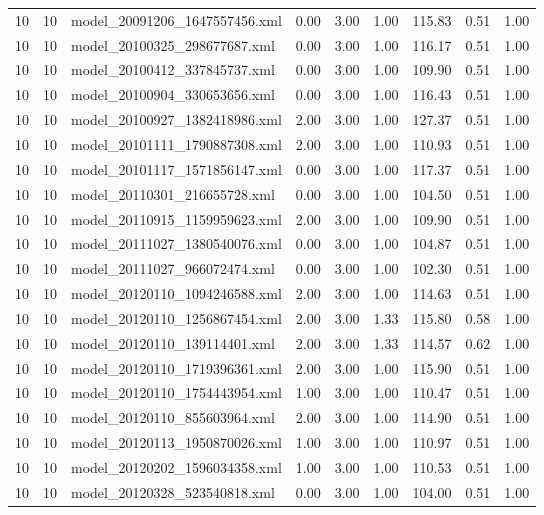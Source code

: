 \begin{table}[ht]
\begin{tabular}{rrlrrrrrr}
   10 &  10 & model\_20091206\_1647557456.xml & 0.00 & 3.00 & 1.00 & 115.83 & 0.51 & 1.00 \\ 
   10 &  10 & model\_20100325\_298677687.xml & 0.00 & 3.00 & 1.00 & 116.17 & 0.51 & 1.00 \\ 
   10 &  10 & model\_20100412\_337845737.xml & 0.00 & 3.00 & 1.00 & 109.90 & 0.51 & 1.00 \\ 
   10 &  10 & model\_20100904\_330653656.xml & 0.00 & 3.00 & 1.00 & 116.43 & 0.51 & 1.00 \\ 
   10 &  10 & model\_20100927\_1382418986.xml & 2.00 & 3.00 & 1.00 & 127.37 & 0.51 & 1.00 \\ 
   10 &  10 & model\_20101111\_1790887308.xml & 2.00 & 3.00 & 1.00 & 110.93 & 0.51 & 1.00 \\ 
   10 &  10 & model\_20101117\_1571856147.xml & 0.00 & 3.00 & 1.00 & 117.37 & 0.51 & 1.00 \\ 
   10 &  10 & model\_20110301\_216655728.xml & 0.00 & 3.00 & 1.00 & 104.50 & 0.51 & 1.00 \\ 
   10 &  10 & model\_20110915\_1159959623.xml & 2.00 & 3.00 & 1.00 & 109.90 & 0.51 & 1.00 \\ 
   10 &  10 & model\_20111027\_1380540076.xml & 0.00 & 3.00 & 1.00 & 104.87 & 0.51 & 1.00 \\ 
   10 &  10 & model\_20111027\_966072474.xml & 0.00 & 3.00 & 1.00 & 102.30 & 0.51 & 1.00 \\ 
   10 &  10 & model\_20120110\_1094246588.xml & 2.00 & 3.00 & 1.00 & 114.63 & 0.51 & 1.00 \\ 
   10 &  10 & model\_20120110\_1256867454.xml & 2.00 & 3.00 & 1.33 & 115.80 & 0.58 & 1.00 \\ 
   10 &  10 & model\_20120110\_139114401.xml & 2.00 & 3.00 & 1.33 & 114.57 & 0.62 & 1.00 \\ 
   10 &  10 & model\_20120110\_1719396361.xml & 2.00 & 3.00 & 1.00 & 115.90 & 0.51 & 1.00 \\ 
   10 &  10 & model\_20120110\_1754443954.xml & 1.00 & 3.00 & 1.00 & 110.47 & 0.51 & 1.00 \\ 
   10 &  10 & model\_20120110\_855603964.xml & 2.00 & 3.00 & 1.00 & 114.90 & 0.51 & 1.00 \\ 
   10 &  10 & model\_20120113\_1950870026.xml & 1.00 & 3.00 & 1.00 & 110.97 & 0.51 & 1.00 \\ 
   10 &  10 & model\_20120202\_1596034358.xml & 1.00 & 3.00 & 1.00 & 110.53 & 0.51 & 1.00 \\ 
   10 &  10 & model\_20120328\_523540818.xml & 0.00 & 3.00 & 1.00 & 104.00 & 0.51 & 1.00 \\ 

\end{tabular}
\end{table}
